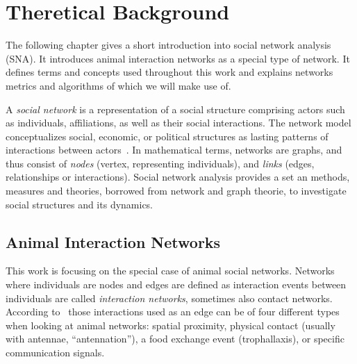 \chapter{Theretical Background}
The following chapter gives a short introduction into social network analysis (SNA). It introduces animal interaction networks as a special type of network. It defines terms and concepts used throughout this work and explains networks metrics and algorithms of which we will make use of.

A \emph{social network} is a representation of a social structure comprising actors such as individuals, affiliations, as well as their social interactions.
The network model conceptualizes social, economic, or political structures as lasting patterns of interactions between actors~\cite{wasserman1994social}.
In mathematical terms, networks are graphs, and thus consist of \emph{nodes} (vertex, representing individuals), and \emph{links} (edges, relationships or interactions).
Social network analysis provides a set an methods, measures and theories, borrowed from network and graph theorie, to investigate social structures and its dynamics.

\section{Animal Interaction Networks}
This work is focusing on the special case of animal social networks.
Networks where individuals are nodes and edges are defined as interaction events between individuals are called \emph{interaction networks}, sometimes also contact networks. 
According to~\textcite{charbonneau2013social} those interactions used as an edge can be of four different types when looking at animal networks: spatial proximity, physical contact (usually with antennae, “antennation”), a food exchange event (trophallaxis), or specific communication signals.

